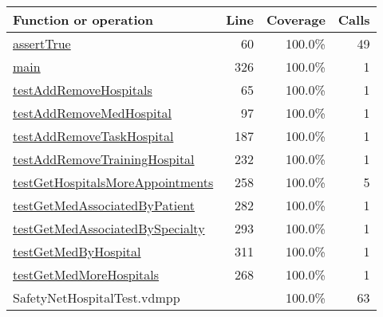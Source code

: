 \begin{longtable}{|l|r|r|r|}
\hline
Function or operation & Line & Coverage & Calls \\
\hline
\hline
\hyperref[assertTrue:60]{assertTrue} & 60&100.0\% & 49 \\
\hline
\hyperref[main:326]{main} & 326&100.0\% & 1 \\
\hline
\hyperref[testAddRemoveHospitals:65]{testAddRemoveHospitals} & 65&100.0\% & 1 \\
\hline
\hyperref[testAddRemoveMedHospital:97]{testAddRemoveMedHospital} & 97&100.0\% & 1 \\
\hline
\hyperref[testAddRemoveTaskHospital:187]{testAddRemoveTaskHospital} & 187&100.0\% & 1 \\
\hline
\hyperref[testAddRemoveTrainingHospital:232]{testAddRemoveTrainingHospital} & 232&100.0\% & 1 \\
\hline
\hyperref[testGetHospitalsMoreAppointments:258]{testGetHospitalsMoreAppointments} & 258&100.0\% & 5 \\
\hline
\hyperref[testGetMedAssociatedByPatient:282]{testGetMedAssociatedByPatient} & 282&100.0\% & 1 \\
\hline
\hyperref[testGetMedAssociatedBySpecialty:293]{testGetMedAssociatedBySpecialty} & 293&100.0\% & 1 \\
\hline
\hyperref[testGetMedByHospital:311]{testGetMedByHospital} & 311&100.0\% & 1 \\
\hline
\hyperref[testGetMedMoreHospitals:268]{testGetMedMoreHospitals} & 268&100.0\% & 1 \\
\hline
\hline
SafetyNetHospitalTest.vdmpp & & 100.0\% & 63 \\
\hline
\end{longtable}

